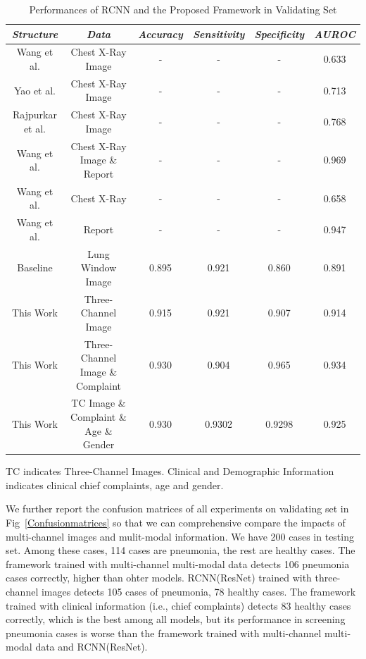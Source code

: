 \documentclass[journal]{IEEEtran}
\begin{document}
\begin{table}[t]
    \caption{Performances of RCNN and the Proposed Framework in Validating Set}
    \begin{center}
    \begin{tabular}{c|c|c|c|c|c}
    \hline
    \textbf{\textit{Structure}} & \textbf{\textit{Data}}& \textbf{\textit{Accuracy}}  & \textbf{\textit{Sensitivity}} & \textbf{\textit{Specificity}} & \textbf{\textit{AUROC}}\\
    \hline
    Wang et al. \cite{Wang2017ChestX}& Chest X-Ray Image & -& - & - & 0.633\\
    Yao et al. \cite{yao2017learning}&Chest X-Ray Image & -& - & - & 0.713\\
    Rajpurkar et al. \cite{Rajpurkar2017CheXNet}&Chest X-Ray Image & -& - & - & 0.768\\
    Wang et al. \cite{Wang2018TieNet} & Chest X-Ray Image \& Report & -& - & - & 0.969\\
    Wang et al. \cite{Wang2018TieNet} & Chest X-Ray & -& - & - & 0.658\\
    Wang et al. \cite{Wang2018TieNet} & Report & -& - & - & 0.947\\

    \hline
    Baseline & Lung Window Image&  0.895 & 0.921 &  0.860 &  0.891 \\
    This Work & Three-Channel Image&  0.915 & 0.921 &  0.907 &  0.914 \\
    This Work & Three-Channel Image \& Complaint &  0.930 & 0.904 &  0.965 & 0.934 \\
    This Work & TC Image \& Complaint \& Age \& Gender&   0.930 & 0.9302 &  0.9298 & 0.925 \\
    \hline
    \end{tabular}
    \vspace{-0cm}
    \end{center}
    \footnotesize{TC indicates Three-Channel Images. Clinical and Demographic Information indicates clinical chief complaints, age and gender.}

    \vspace{-0cm}
    \label{mpdnetres}
    \end{table}


We further report the confusion matrices of all experiments on validating set in Fig~\ref{Confusionmatrices} so that we can comprehensive compare the impacts of multi-channel images and mulit-modal information. 
We have 200 cases in testing set. Among these cases, 114 cases are pneumonia, the rest are healthy cases. 
The framework trained with multi-channel multi-modal data detects 106 pneumonia cases correctly, higher than ohter models. RCNN(ResNet) trained with three-channel images detects 105 cases of pneumonia, 78 healthy cases. The framework trained with clinical information (i.e., chief complaints) detects 83 healthy cases correctly, which is the best among all models, but its performance in screening pneumonia cases is worse than the framework trained with multi-channel multi-modal data and RCNN(ResNet). 
\end{document}
